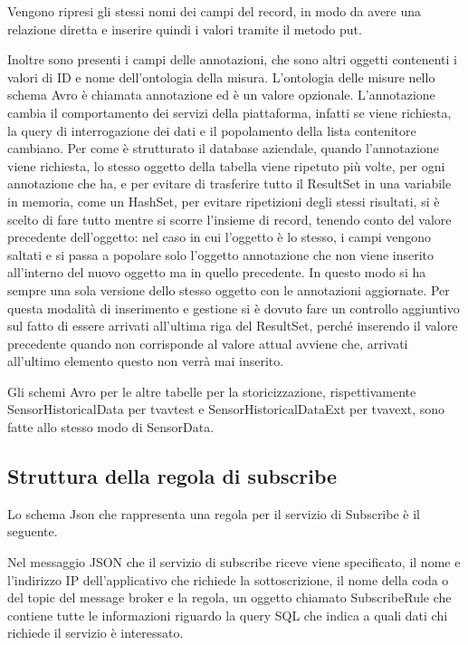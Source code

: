 Vengono ripresi gli stessi nomi dei campi del record, in modo da avere una relazione diretta e inserire quindi i valori tramite il metodo put.

Inoltre sono presenti i campi delle annotazioni, che sono altri oggetti contenenti i valori di ID e nome dell’ontologia della misura. L’ontologia delle misure nello schema Avro è chiamata annotazione ed è un valore opzionale.
L’annotazione cambia il comportamento dei servizi della piattaforma, infatti se viene richiesta, la query di interrogazione dei dati e il popolamento della lista contenitore cambiano. Per come è strutturato il database aziendale, quando l’annotazione viene richiesta, lo stesso oggetto della tabella viene ripetuto più volte, per ogni annotazione che ha, e per evitare di trasferire tutto il ResultSet in una variabile in memoria, come un HashSet, per evitare ripetizioni degli stessi risultati, si è scelto di fare tutto mentre si scorre l'insieme di record, tenendo conto del valore precedente dell’oggetto: nel caso in cui l’oggetto è lo stesso, i campi vengono saltati e si passa a popolare solo l’oggetto annotazione che non viene inserito all’interno del nuovo oggetto ma in quello precedente. In questo modo si ha sempre una sola versione dello stesso oggetto con le annotazioni aggiornate. Per questa modalità di inserimento e gestione si è dovuto fare un controllo aggiuntivo sul fatto di essere arrivati all’ultima riga del ResultSet, perché inserendo il valore precedente quando non corrisponde al valore attual avviene che, arrivati all’ultimo elemento questo non verrà mai inserito.

Gli schemi Avro per le altre tabelle per la storicizzazione, rispettivamente SensorHistoricalData per tvavtest e SensorHistoricalDataExt per tvavext, sono fatte allo stesso modo di SensorData.
\subsection{Struttura della regola di subscribe}
Lo schema Json che rappresenta una regola per il servizio di Subscribe è il seguente. 
{\selectfont
	
}
Nel messaggio JSON che il servizio di subscribe riceve viene specificato, il nome e l’indirizzo IP dell’applicativo che richiede la sottoscrizione, il nome della coda o del topic del message broker e la regola, un oggetto chiamato SubscribeRule che contiene tutte le informazioni riguardo la query SQL che indica a quali dati chi richiede il servizio è interessato.
\clearpage

